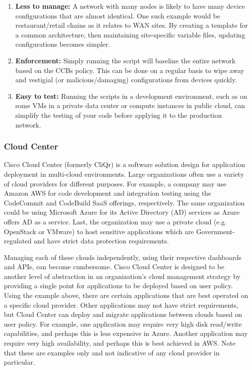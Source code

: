 \begin{enumerate}
  \item \textbf{Less to manage:} A network with many nodes is likely to have many
  device configurations that are almost identical. One such example would be
  restaurant/retail chains as it relates to WAN sites. By creating a template
  for a common architecture, then maintaining site-specific variable files,
  updating configurations becomes simpler.
  \item \textbf{Enforcement:} Simply running the script will baseline the entire
  network based on the CCBs policy. This can be done on a regular basis to wipe
  away and vestigial (or malicious/damaging) configurations from devices quickly.
  \item \textbf{Easy to test:} Running the scripts in a development environment, such
  as on some VMs in a private data center or compute instances in public cloud,
  can simplify the testing of your code before applying it to the production network.
\end{enumerate}

\subsubsection{Cloud Center}
Cisco Cloud Center (formerly CliQr) is a software solution design for
application deployment in multi-cloud environments. Large organizations often
use a variety of cloud providers for different purposes. For example, a
company may use Amazon AWS for code development and integration testing using
the CodeCommit and CodeBuild SaaS offerings, respectively. The same
organization could be using Microsoft Azure for its Active Directory (AD)
services as Azure offers AD as a service. Last, the organization may use a
private cloud (e.g. OpenStack or VMware) to host sensitive applications which
are Government-regulated and have strict data protection requirements.

Managing each of these clouds independently, using their respective dashboards
and APIs, can become cumbersome. Cisco Cloud Center is designed to be another
level of abstraction in an organization's cloud management strategy by
providing a single point for applications to be deployed based on user policy.
Using the example above, there are certain applications that are best operated
on a specific cloud provider. Other applications may not have strict
requirements, but Cloud Center can deploy and migrate applications between
clouds based on user policy. For example, one application may require very
high disk read/write capabilities, and perhaps this is less expensive in
Azure. Another application may require very high availability, and perhaps
this is best achieved in AWS\@. Note that these are examples only and not
indicative of any cloud provider in particular.


